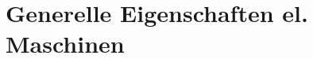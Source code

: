 \newcommand{\titleinfo}{Elekrische Maschinen - Formelsammlung}
\newcommand{\authorinfo}{F. Braun, L. Schmid, U. Giger, R. Koller, S.
Arnold, S. Ferreti}
\newcommand{\versioninfo}{$Revision: 975 $ - powered by \LaTeX}

%



 
\newcommand{\abb}[3]{
\begin{center}
\texttt{[image: \#1]} \\
Abbildung \arabic{abbildungen}: #3 
\stepcounter{abbildungen}    
    \end{center}
}




\section{Generelle Eigenschaften el. Maschinen}
